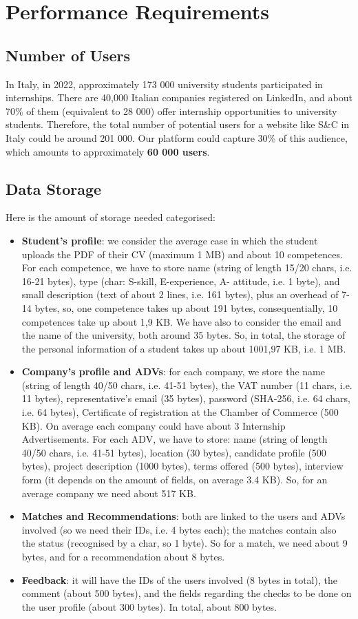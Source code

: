 \section{Performance Requirements}
\subsection{Number of Users}
In Italy, in 2022, approximately 173 000 university students participated in internships. There are 40,000 Italian companies registered on LinkedIn, and about 70\% of them (equivalent to 28 000) offer internship opportunities to university students. Therefore, the total number of potential users for a website like S\&C in Italy could be around 201 000. Our platform could capture 30\% of this audience, which amounts to approximately \textbf{60 000 users}.
\subsection{Data Storage}
Here is the amount of storage needed categorised:
\begin{itemize}
    \item \textbf{Student's profile}: we consider the average case in which the student uploads the PDF of their CV (maximum 1 MB) and about 10 competences. For each competence, we have to store name (string of length 15/20 chars, i.e. 16-21 bytes), type (char: S-skill, E-experience, A- attitude, i.e. 1 byte), and small description (text of about 2 lines, i.e. 161 bytes), plus an overhead of 7-14 bytes, so, one competence takes up about 191 bytes, consequentially, 10 competences take up about 1,9 KB. We have also to consider the email and the name of the university, both around 35 bytes. So, in total, the storage of the personal information of a student takes up about 1001,97 KB, i.e. 1 MB.
    \item \textbf{Company's profile and ADVs}: for each company, we store the name (string of length 40/50 chars, i.e. 41-51 bytes), the VAT number (11 chars, i.e. 11 bytes), representative's email (35 bytes), password (SHA-256, i.e. 64 chars, i.e. 64 bytes), Certificate of registration at the Chamber of Commerce (500 KB). On average each company could have about 3 Internship Advertisements. For each ADV, we have to store: name (string of length 40/50 chars, i.e. 41-51 bytes), location (30 bytes), candidate profile (500 bytes), project description (1000 bytes), terms offered (500 bytes), interview form (it depends on the amount of fields, on average 3.4 KB). So, for an average company we need about 517 KB.
    \item \textbf{Matches and Recommendations}: both are linked to the users and ADVs involved (so we need their IDs, i.e. 4 bytes each); the matches contain also the status (recognised by a char, so 1 byte). So for a match, we need about 9 bytes, and for a recommendation about 8 bytes. 
    \item \textbf{Feedback}: it will have the IDs of the users involved (8 bytes in total), the comment (about 500 bytes), and the fields regarding the checks to be done on the user profile (about 300 bytes). In total, about 800 bytes.
\end{itemize}

